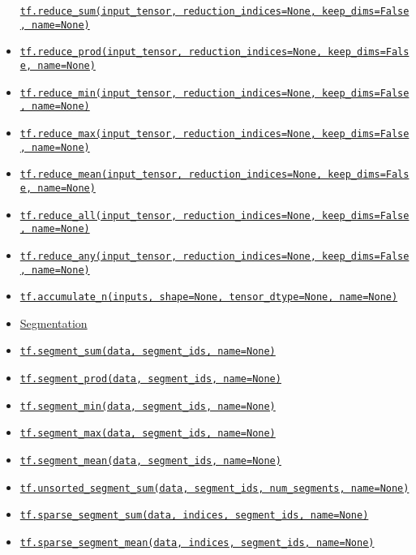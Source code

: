 \begin{itemize}
  \protect\hyperlink{reduceux5fsum}{\texttt{tf.reduce\_sum(input\_tensor,\ reduction\_indices=None,\ keep\_dims=False,\ name=None)}}
\item
  \protect\hyperlink{reduceux5fprod}{\texttt{tf.reduce\_prod(input\_tensor,\ reduction\_indices=None,\ keep\_dims=False,\ name=None)}}
\item
  \protect\hyperlink{reduceux5fmin}{\texttt{tf.reduce\_min(input\_tensor,\ reduction\_indices=None,\ keep\_dims=False,\ name=None)}}
\item
  \protect\hyperlink{reduceux5fmax}{\texttt{tf.reduce\_max(input\_tensor,\ reduction\_indices=None,\ keep\_dims=False,\ name=None)}}
\item
  \protect\hyperlink{reduceux5fmean}{\texttt{tf.reduce\_mean(input\_tensor,\ reduction\_indices=None,\ keep\_dims=False,\ name=None)}}
\item
  \protect\hyperlink{reduceux5fall}{\texttt{tf.reduce\_all(input\_tensor,\ reduction\_indices=None,\ keep\_dims=False,\ name=None)}}
\item
  \protect\hyperlink{reduceux5fany}{\texttt{tf.reduce\_any(input\_tensor,\ reduction\_indices=None,\ keep\_dims=False,\ name=None)}}
\item
  \protect\hyperlink{accumulateux5fn}{\texttt{tf.accumulate\_n(inputs,\ shape=None,\ tensor\_dtype=None,\ name=None)}}
\item
  \protect\hyperlink{AUTOGENERATED-segmentation}{Segmentation}
\item
  \protect\hyperlink{segmentux5fsum}{\texttt{tf.segment\_sum(data,\ segment\_ids,\ name=None)}}
\item
  \protect\hyperlink{segmentux5fprod}{\texttt{tf.segment\_prod(data,\ segment\_ids,\ name=None)}}
\item
  \protect\hyperlink{segmentux5fmin}{\texttt{tf.segment\_min(data,\ segment\_ids,\ name=None)}}
\item
  \protect\hyperlink{segmentux5fmax}{\texttt{tf.segment\_max(data,\ segment\_ids,\ name=None)}}
\item
  \protect\hyperlink{segmentux5fmean}{\texttt{tf.segment\_mean(data,\ segment\_ids,\ name=None)}}
\item
  \protect\hyperlink{unsortedux5fsegmentux5fsum}{\texttt{tf.unsorted\_segment\_sum(data,\ segment\_ids,\ num\_segments,\ name=None)}}
\item
  \protect\hyperlink{sparseux5fsegmentux5fsum}{\texttt{tf.sparse\_segment\_sum(data,\ indices,\ segment\_ids,\ name=None)}}
\item
  \protect\hyperlink{sparseux5fsegmentux5fmean}{\texttt{tf.sparse\_segment\_mean(data,\ indices,\ segment\_ids,\ name=None)}}

\end{itemize}
